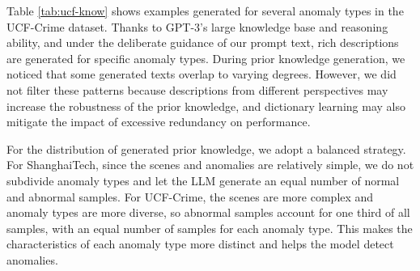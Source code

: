 Table \ref{tab:ucf-know} shows examples generated for several anomaly types in the UCF-Crime dataset. Thanks to GPT-3's large knowledge base and reasoning ability, and under the deliberate guidance of our prompt text, rich descriptions are generated for specific anomaly types. During prior knowledge generation, we noticed that some generated texts overlap to varying degrees. However, we did not filter these patterns because descriptions from different perspectives may increase the robustness of the prior knowledge, and dictionary learning may also mitigate the impact of excessive redundancy on performance.

For the distribution of generated prior knowledge, we adopt a balanced strategy. For ShanghaiTech, since the scenes and anomalies are relatively simple, we do not subdivide anomaly types and let the LLM generate an equal number of normal and abnormal samples. For UCF-Crime, the scenes are more complex and anomaly types are more diverse, so abnormal samples account for one third of all samples, with an equal number of samples for each anomaly type. This makes the characteristics of each anomaly type more distinct and helps the model detect anomalies.

